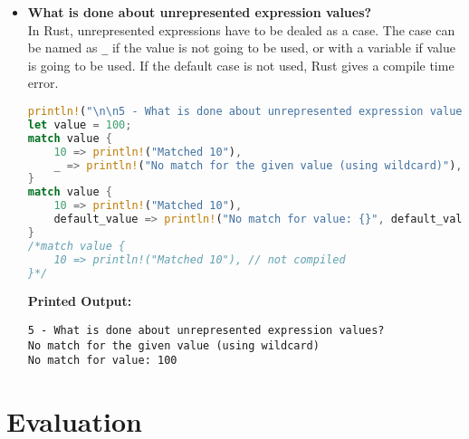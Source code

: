 \documentclass{article}
\begin{document}
\begin{itemize}
\begin{lstlisting}[language=Rust]
// expression with variables
let m: i32 = 2;
let n: i32 = 3;
match value {
    x if x == m * n => println!("Matched 6"),
    x if x == m + n => println!("Matched 5"),
    x => println!("Matched other value: {}", x),
}

// variables with binding
let a: i32 = 1;
let b: i32 = 3;
match value {
    x if x == a => println!("Matched a"),
    x if x == b => println!("Matched b"),
    _ => (),
}
\end{lstlisting}
\textbf{Printed Output:} \begin{verbatim}
4 - How are case values specified?
Matched 3
Matched 3
Matched Hello
Matched 1, 2, or 3
Matched range 1 to 3: 1
Matched range 1 to 3: 2
Matched range 1 to 3: 3
Matched range 4 to 6: 4
Matched range 4 to 6: 5
Matched range 4 to 6: 6
No match for: 7
No match for: 8
No match for: 9
Matched int: 4
Matched other value: 3
Matched b
\end{verbatim}




\item \textbf{What is done about unrepresented expression values?} \\
In Rust, unrepresented expressions have to be dealed as a case. The case can be named as \texttt{\_} if the value is not going to be used, or with a variable if value is going to be used. If the default case is not used, Rust gives a compile time error.
\begin{lstlisting}[language=Rust]
println!("\n\n5 - What is done about unrepresented expression values?");
let value = 100;
match value {
    10 => println!("Matched 10"),
    _ => println!("No match for the given value (using wildcard)"),
}
match value {
    10 => println!("Matched 10"),
    default_value => println!("No match for value: {}", default_value),
}
/*match value {
    10 => println!("Matched 10"), // not compiled
}*/
\end{lstlisting}
\textbf{Printed Output:} \begin{verbatim}
5 - What is done about unrepresented expression values?
No match for the given value (using wildcard)
No match for value: 100
\end{verbatim}
\end{itemize}


\newpage

\section{Evaluation}
\end{document}
